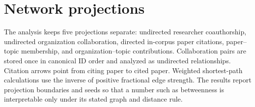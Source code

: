 \section{Network projections}

The analysis keeps five projections separate: undirected researcher
coauthorship, undirected organization collaboration, directed in-corpus paper
citations, paper--topic membership, and organization--topic contributions.
Collaboration pairs are stored once in canonical ID order and analyzed as
undirected relationships. Citation arrows point from citing paper to cited
paper. Weighted shortest-path calculations use the inverse of positive
fractional edge strength. The results report projection boundaries and seeds so
that a number such as betweenness is interpretable only under its stated graph
and distance rule.


